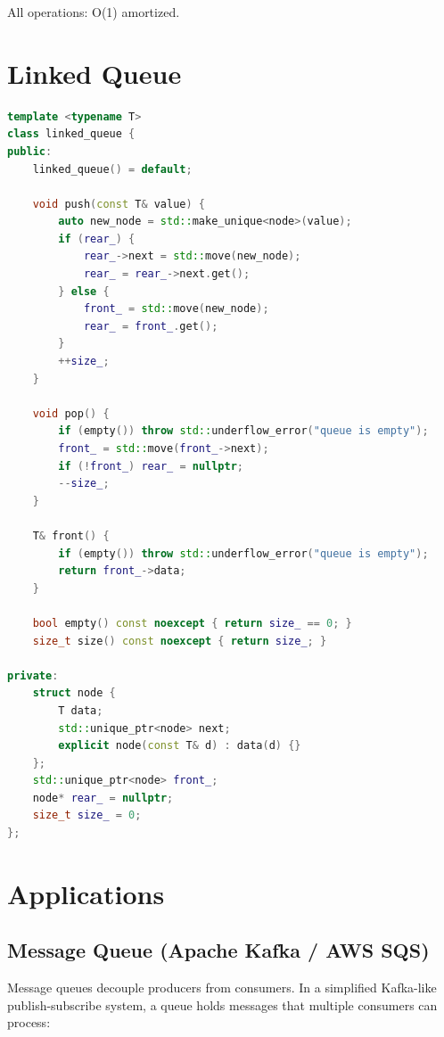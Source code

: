 All operations: O(1) amortized.

\section{Linked Queue}

\begin{lstlisting}[language=C++]
template <typename T>
class linked_queue {
public:
    linked_queue() = default;

    void push(const T& value) {
        auto new_node = std::make_unique<node>(value);
        if (rear_) {
            rear_->next = std::move(new_node);
            rear_ = rear_->next.get();
        } else {
            front_ = std::move(new_node);
            rear_ = front_.get();
        }
        ++size_;
    }

    void pop() {
        if (empty()) throw std::underflow_error("queue is empty");
        front_ = std::move(front_->next);
        if (!front_) rear_ = nullptr;
        --size_;
    }

    T& front() {
        if (empty()) throw std::underflow_error("queue is empty");
        return front_->data;
    }

    bool empty() const noexcept { return size_ == 0; }
    size_t size() const noexcept { return size_; }

private:
    struct node {
        T data;
        std::unique_ptr<node> next;
        explicit node(const T& d) : data(d) {}
    };
    std::unique_ptr<node> front_;
    node* rear_ = nullptr;
    size_t size_ = 0;
};
\end{lstlisting}

\section{Applications}

\subsection{Message Queue (Apache Kafka / AWS SQS)}

Message queues decouple producers from consumers. In a simplified Kafka-like publish-subscribe system, a queue holds messages that multiple consumers can process:

